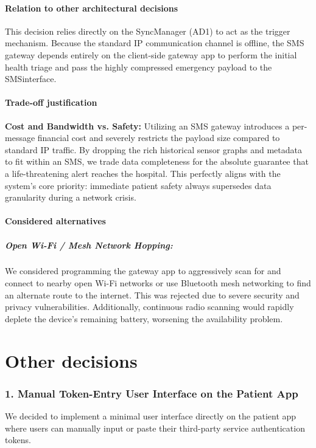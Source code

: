 \subsubsection*{Relation to other architectural decisions}
This decision relies directly on the SyncManager (AD1) to act as the trigger mechanism. Because the standard IP communication channel is offline, the SMS gateway depends entirely on the client-side gateway app to perform the initial health triage and pass the highly compressed emergency payload to the SMSinterface.

\subsubsection*{Trade-off justification}
\textbf{Cost and Bandwidth vs. Safety:} Utilizing an SMS gateway introduces a per-message financial cost and severely restricts the payload size compared to standard IP traffic. By dropping the rich historical sensor graphs and metadata to fit within an SMS, we trade data completeness for the absolute guarantee that a life-threatening alert reaches the hospital. This perfectly aligns with the system's core priority: immediate patient safety always supersedes data granularity during a network crisis.

\subsubsection*{Considered alternatives}
\paragraph{Open Wi-Fi / Mesh Network Hopping:}
We considered programming the gateway app to aggressively scan for and connect to nearby open Wi-Fi networks or use Bluetooth mesh networking to find an alternate route to the internet. This was rejected due to severe security and privacy vulnerabilities. Additionally, continuous radio scanning would rapidly deplete the device's remaining battery, worsening the availability problem.
\chapter{Other decisions}\label{sec:otherdecisions}

\subsection*{1. Manual Token-Entry User Interface on the Patient App}
We decided to implement a minimal user interface directly on the patient app where users can manually input or paste their third-party service authentication tokens.

